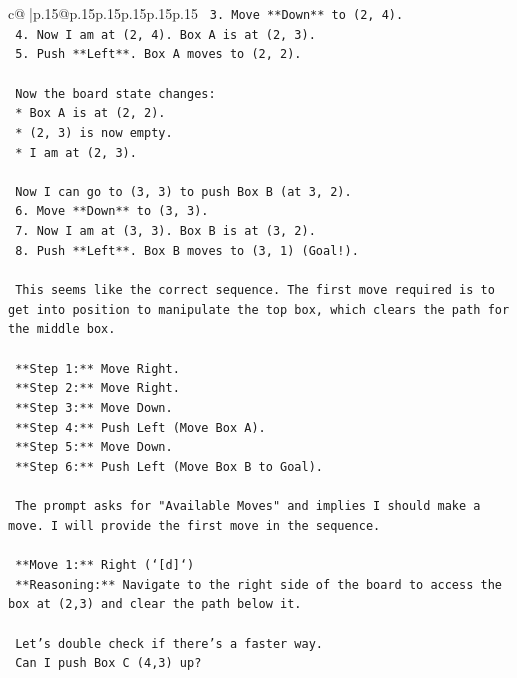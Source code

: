 \documentclass{article}
\begin{document}
{\begin{supertabular}{c@{$\;$}|p{.15\linewidth}@{}p{.15\linewidth}p{.15\linewidth}p{.15\linewidth}p{.15\linewidth}p{.15\linewidth}}
{{{\texttt{    3.  Move **Down** to (2, 4).} \\
\texttt{    4.  Now I am at (2, 4). Box A is at (2, 3).} \\
\texttt{    5.  Push **Left**. Box A moves to (2, 2).} \\
\\ 
\texttt{    Now the board state changes:} \\
\texttt{    *   Box A is at (2, 2).} \\
\texttt{    *   (2, 3) is now empty.} \\
\texttt{    *   I am at (2, 3).} \\
\\ 
\texttt{    Now I can go to (3, 3) to push Box B (at 3, 2).} \\
\texttt{    6.  Move **Down** to (3, 3).} \\
\texttt{    7.  Now I am at (3, 3). Box B is at (3, 2).} \\
\texttt{    8.  Push **Left**. Box B moves to (3, 1) (Goal!).} \\
\\ 
\texttt{    This seems like the correct sequence. The first move required is to get into position to manipulate the top box, which clears the path for the middle box.} \\
\\ 
\texttt{    **Step 1:** Move Right.} \\
\texttt{    **Step 2:** Move Right.} \\
\texttt{    **Step 3:** Move Down.} \\
\texttt{    **Step 4:** Push Left (Move Box A).} \\
\texttt{    **Step 5:** Move Down.} \\
\texttt{    **Step 6:** Push Left (Move Box B to Goal).} \\
\\ 
\texttt{    The prompt asks for "Available Moves" and implies I should make a move. I will provide the first move in the sequence.} \\
\\ 
\texttt{    **Move 1:** Right (`{[}d{]}`)} \\
\texttt{    **Reasoning:** Navigate to the right side of the board to access the box at (2,3) and clear the path below it.} \\
\\ 
\texttt{    Let's double check if there's a faster way.} \\
\texttt{    Can I push Box C (4,3) up?} \\
}}}
\end{supertabular}}
\end{document}
